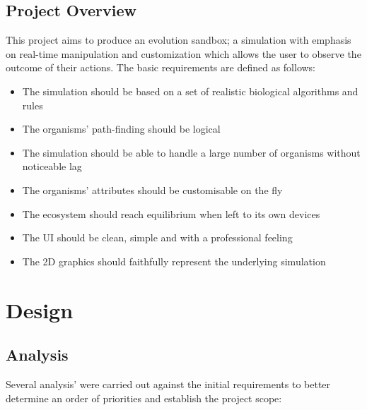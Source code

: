 \documentclass{ueacmpstyle}
\begin{document}
\subsection{Project Overview}
This project aims to produce an evolution sandbox; a simulation with emphasis on real-time manipulation and customization which allows the user to observe the outcome of their actions. The basic requirements are defined as follows:
\begin{itemize}
	\item The simulation should be based on a set of realistic biological algorithms and rules
	\item The organisms' path-finding should be logical
	\item The simulation should be able to handle a large number of organisms without noticeable lag
	\item The organisms' attributes should be customisable on the fly
	\item The ecosystem should reach equilibrium when left to its own devices
	\item The UI should be clean, simple and with a professional feeling
	\item The 2D graphics should faithfully represent the underlying simulation
\end{itemize}

\section{Design}

\subsection{Analysis}

Several analysis' were carried out against the initial requirements to better determine an order of priorities and establish the project scope:
\end{document}
